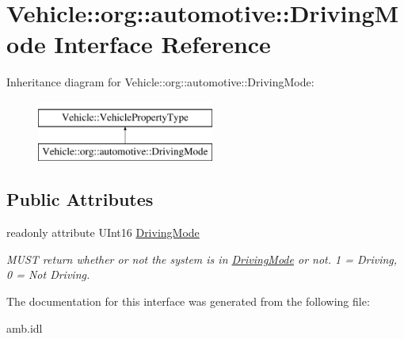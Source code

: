 \hypertarget{interfaceVehicle_1_1org_1_1automotive_1_1DrivingMode}{\section{Vehicle\-:\-:org\-:\-:automotive\-:\-:Driving\-Mode Interface Reference}
\label{interfaceVehicle_1_1org_1_1automotive_1_1DrivingMode}
}
Inheritance diagram for Vehicle\-:\-:org\-:\-:automotive\-:\-:Driving\-Mode\-:\begin{figure}[H]
\begin{center}
\leavevmode
\includegraphics[height=2.000000cm]{interfaceVehicle_1_1org_1_1automotive_1_1DrivingMode}
\end{center}
\end{figure}
\subsection*{Public Attributes}
\begin{DoxyCompactItemize}
\item 
\hypertarget{interfaceVehicle_1_1org_1_1automotive_1_1DrivingMode_afa3cae8e63756c3f562dcdd14b9bd164}{readonly attribute U\-Int16 \hyperlink{interfaceVehicle_1_1org_1_1automotive_1_1DrivingMode_afa3cae8e63756c3f562dcdd14b9bd164}{Driving\-Mode}}\label{interfaceVehicle_1_1org_1_1automotive_1_1DrivingMode_afa3cae8e63756c3f562dcdd14b9bd164}

\begin{DoxyCompactList}\small\item\em M\-U\-S\-T return whether or not the system is in \hyperlink{interfaceVehicle_1_1org_1_1automotive_1_1DrivingMode}{Driving\-Mode} or not. 1 = Driving, 0 = Not Driving. \end{DoxyCompactList}\end{DoxyCompactItemize}


The documentation for this interface was generated from the following file\-:\begin{DoxyCompactItemize}
\item 
amb.\-idl\end{DoxyCompactItemize}
